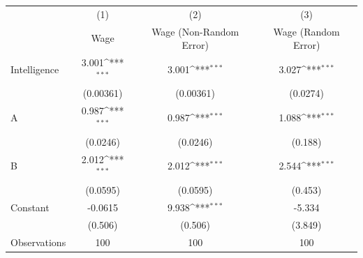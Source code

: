 {
\def\sym#1{\ifmmode^{#1}\else\(^{#1}\)\fi}
\begin{tabular}{l*{3}{c}}
\toprule
                    &\multicolumn{1}{c}{(1)}&\multicolumn{1}{c}{(2)}&\multicolumn{1}{c}{(3)}\\
                    &\multicolumn{1}{c}{Wage}&\multicolumn{1}{c}{Wage (Non-Random Error)}&\multicolumn{1}{c}{Wage (Random Error)}\\
\midrule
Intelligence        &       3.001\sym{***}&       3.001\sym{***}&       3.027\sym{***}\\
                    &   (0.00361)         &   (0.00361)         &    (0.0274)         \\
\addlinespace
A                   &       0.987\sym{***}&       0.987\sym{***}&       1.088\sym{***}\\
                    &    (0.0246)         &    (0.0246)         &     (0.188)         \\
\addlinespace
B                   &       2.012\sym{***}&       2.012\sym{***}&       2.544\sym{***}\\
                    &    (0.0595)         &    (0.0595)         &     (0.453)         \\
\addlinespace
Constant            &     -0.0615         &       9.938\sym{***}&      -5.334         \\
                    &     (0.506)         &     (0.506)         &     (3.849)         \\
\midrule
Observations        &         100         &         100         &         100         \\
\bottomrule
\end{tabular}
}
